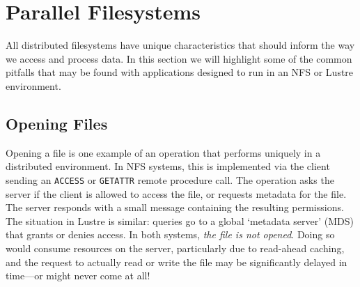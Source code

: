 % 

\section{Parallel Filesystems}\label{sec:parallel_fs}

All distributed filesystems have unique characteristics that should
inform the way we access and process data.  In this section we
will highlight some of the common pitfalls that may be found with
applications designed to run in an NFS or Lustre environment.

\subsection{Opening Files}

Opening a file is one example of an operation that performs uniquely
in a distributed environment.  In NFS systems, this is implemented
via the client sending an \verb!ACCESS! or \verb!GETATTR! remote
procedure call.  The operation asks the server if the client is allowed
to access the file, or requests metadata for the file.  The server
responds with a small message containing the resulting permissions.
The situation in Lustre is similar: queries go to a global `metadata
server' (MDS) that grants or denies access.  In both systems,
\emph{the file is not opened}.  Doing so would consume resources on
the server, particularly due to read-ahead caching, and the request
to actually read or write the file may be significantly delayed in
time---or might never come at all!

%

